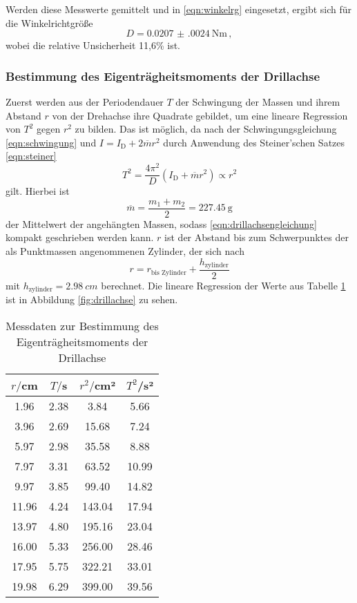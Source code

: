 Werden diese Messwerte gemittelt und in \eqref{eqn:winkelrg} eingesetzt, ergibt
sich für die Winkelrichtgröße
\begin{equation}
  D = \SI{0.0207(0024)}{\newton\meter}\,,
\end{equation}
wobei die relative Unsicherheit 11,6\% ist.
\subsubsection{Bestimmung des Eigenträgheitsmoments der Drillachse}
Zuerst werden aus der Periodendauer $T$ der Schwingung der Massen und ihrem
Abstand $r$ von der Drehachse ihre Quadrate gebildet, um eine lineare Regression
von $T^2$ gegen $r^2$ zu bilden. Das ist möglich, da nach der Schwingungsgleichung
\eqref{eqn:schwingung} und $I=I_{\text{D}}+2\overline{m}r^2$ durch Anwendung des
Steiner'schen Satzes \eqref{eqn:steiner}
\begin{equation}
  T^2 = \frac{4\pi^2}{D}(I_{\text{D}}+\overline{m}r^2)\propto r^2
  \label{eqn:drillachsengleichung}
\end{equation}
gilt. Hierbei ist
\begin{equation}
  \overline{m} = \frac{m_1+m_2}{2} =\SI{227.45}{\gram}
\end{equation}
der Mittelwert der angehängten Massen, sodass \eqref{eqn:drillachsengleichung}
kompakt geschrieben werden kann. $r$ ist der Abstand bis zum Schwerpunktes der
als Punktmassen angenommenen Zylinder, der sich nach
\begin{equation}
  r = r_{\text{bis Zylinder}}
      +\frac{h_{\text{zylinder}}}{2}
\end{equation}
mit $h_{\text{zylinder}} = \SI{2.98}{cm}$ berechnet.
Die lineare Regression der Werte aus Tabelle \ref{tab:drillachse} ist in
Abbildung \ref{fig:drillachse} zu sehen.

\begin{table}
\centering
\caption{Messdaten zur Bestimmung des Eigenträgheitsmoments der Drillachse}
\label{tab:drillachse}
\begin{tabular}{c c c c}
\toprule
$r/$cm & $T/$s & $r^2/$cm² & $T^2$/s² \\
\midrule
 1.96 & 2.38 &   3.84 &  5.66 \\
 3.96 & 2.69 &  15.68 &  7.24 \\
 5.97 & 2.98 &  35.58 &  8.88 \\
 7.97 & 3.31 &  63.52 & 10.99 \\
 9.97 & 3.85 &  99.40 & 14.82 \\
11.96 & 4.24 & 143.04 & 17.94 \\
13.97 & 4.80 & 195.16 & 23.04 \\
16.00 & 5.33 & 256.00 & 28.46 \\
17.95 & 5.75 & 322.21 & 33.01 \\
19.98 & 6.29 & 399.00 & 39.56 \\
\bottomrule
\end{tabular}
\end{table}

